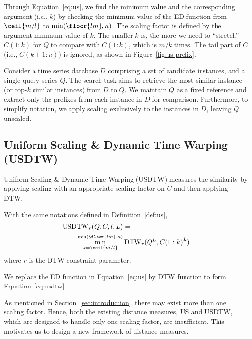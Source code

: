 Through Equation~\ref{eq:us}, we find the minimum value and the corresponding argument (i.e., $k$) by checking the minimum value of the ED function from $\ceil{m/l}$ to $\min (\floor{lm}, n)$.  
The scaling factor is defined by the argument minimum value of $k$.
The smaller $k$ is, the more we need to ``stretch'' $C(1:k)$ for $Q$ to compare with $C(1:k)$, which is $m/k$ times.
%
The tail part of $C$ (i.e., $C(k+1:n)$) is ignored, as shown in Figure~\ref{fig:us-prefix}.

Consider a time series database $D$ comprising a set of candidate instances, and a single query series $Q$. The search task aims to retrieve the most similar instance (or top-$k$ similar instances) from $D$ to $Q$. 
We maintain $Q$ as a fixed reference and extract only the prefixes from each instance in $D$ for comparison. 
Furthermore, to simplify notation, we apply scaling exclusively to the instances in $D$, leaving $Q$ unscaled.

\subsection{Uniform Scaling \& Dynamic Time Warping (USDTW)} %
 
Uniform Scaling \& Dynamic Time Warping (USDTW) measures the similarity by applying scaling with an appropriate scaling factor on $C$ and then applying DTW. 


\begin{definition}
    \label{def:usdtw}
    With the same notations defined in Definition~\ref{def:us},
    \begin{equation} \label{eq:usdtw}
    \begin{split}
        \operatorname{USDTW}_r(Q,C,l, L) &= \\
        \min_{k=\ceil{m/l}}^{\min (\floor{lm}, n)} & \operatorname{DTW}_r(Q^L, {C(1:k)}^L)
    \end{split}
    \end{equation}
where $r$ is the DTW constraint parameter.
\end{definition}
We replace the ED function in Equation~\ref{eq:us} by DTW function to form Equation~\ref{eq:usdtw}.

As mentioned in Section~\ref{sec:introduction}, there may exist more than one scaling factor. 
Hence, both the existing distance measures, US and USDTW, which are designed to handle only one scaling factor, are insufficient.
This motivates us to design a new framework of distance measures.

